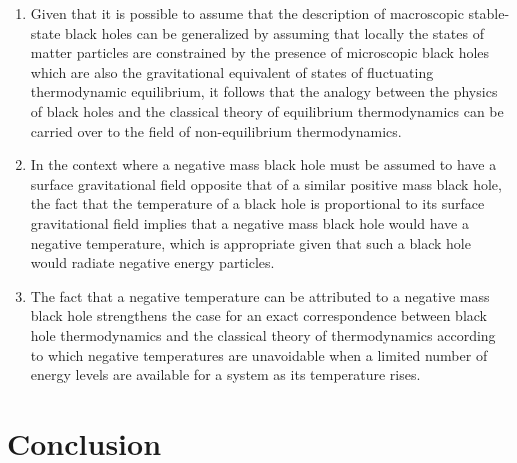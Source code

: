 \documentclass[notitlepage,12pt]{report}
\begin{document}
\begin{enumerate}
\item Given that it is possible to assume that the description of macroscopic stable-state black holes can be generalized by assuming that locally the states of matter particles are constrained by the presence of microscopic black holes which are also the gravitational equivalent of states of fluctuating thermodynamic equilibrium, it follows that the analogy between the physics of black holes and the classical theory of equilibrium thermodynamics can be carried over to the field of non-equilibrium thermodynamics.

\item In the context where a negative mass black hole must be assumed to have a surface gravitational field opposite that of a similar positive mass black hole, the fact that the temperature of a black hole is proportional to its surface gravitational field implies that a negative mass black hole would have a negative temperature, which is appropriate given that such a black hole would radiate negative energy particles.

\item The fact that a negative temperature can be attributed to a negative mass black hole strengthens the case for an exact correspondence between black hole thermodynamics and the classical theory of thermodynamics according to which negative temperatures are unavoidable when a limited number of energy levels are available for a system as its temperature rises.

\end{enumerate}


\chapter{Conclusion\label{chap:04}}
\end{document}
